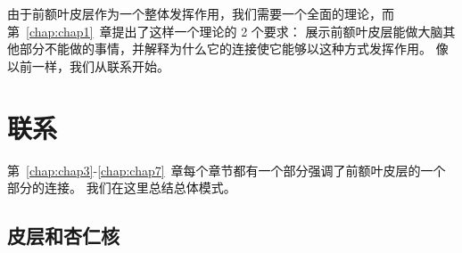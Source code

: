 由于前额叶皮层作为一个整体发挥作用，我们需要一个全面的理论，而第~\ref{chap:chap1}~章提出了这样一个理论的 2 个要求：
展示前额叶皮层能做大脑其他部分不能做的事情，并解释为什么它的连接使它能够以这种方式发挥作用。
像以前一样，我们从联系开始。



\section{联系}
\par
第~\ref{chap:chap3}-\ref{chap:chap7}~章每个章节都有一个部分强调了前额叶皮层的一个部分的连接。
我们在这里总结总体模式。



\subsection{皮层和杏仁核}

